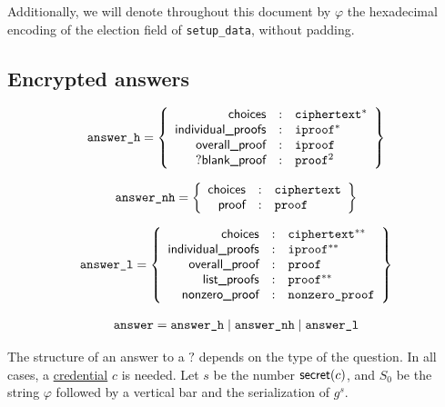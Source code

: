 \documentclass[a4paper]{article}
\begin{document}
\label{varphi}
Additionally, we will denote throughout this document by $\varphi$ the
hexadecimal encoding of the \textsf{election} field of
\texttt{setup\_data}, without padding.

\subsection{Encrypted answers}
\label{answers}

\begin{gather*}
  \texttt{answer\_h}=\left\{
    \begin{array}{rcl}
      \textsf{choices}&:&\texttt{ciphertext}^\ast\\
      \textsf{individual\_proofs}&:&\texttt{iproof}^\ast\\
      \textsf{overall\_proof}&:&\texttt{iproof}\\
      ?\textsf{blank\_proof}&:&\texttt{proof}^2
    \end{array}
  \right\}
\end{gather*}

\begin{gather*}
  \texttt{answer\_nh}=\left\{
    \begin{array}{rcl}
      \textsf{choices}&:&\texttt{ciphertext}\\
      \textsf{proof}&:&\texttt{proof}
    \end{array}
  \right\}
\end{gather*}

\begin{gather*}
  \texttt{answer\_l}=\left\{
    \begin{array}{rcl}
      \textsf{choices}&:&\texttt{ciphertext}^{\ast\ast}\\
      \textsf{individual\_proofs}&:&\texttt{iproof}^{\ast\ast}\\
      \textsf{overall\_proof}&:&\texttt{proof}\\
      \textsf{list\_proofs}&:&\texttt{proof}^{\ast\ast}\\
      \textsf{nonzero\_proof}&:&\texttt{nonzero\_proof}
    \end{array}
  \right\}
\end{gather*}

\begin{gather*}
  \texttt{answer}=\texttt{answer\_h}\mid\texttt{answer\_nh}\mid\texttt{answer\_l}
\end{gather*}

The structure of an answer to a \hyperref[elections]{$\question$}
depends on the type of the question. In all cases, a
\hyperref[credentials]{credential} $c$ is needed. Let $s$ be the
number $\textsf{secret}(c)$, and $S_0$ be the string $\varphi$ followed by a
vertical bar and the serialization of $g^s$.
\end{document}
